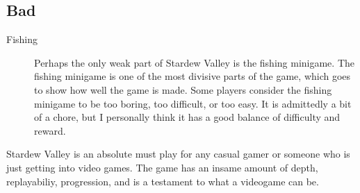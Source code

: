 \documentclass{article}
\begin{document}
\subsection{Bad}
\begin{description}
      \item[Fishing] Perhaps the only weak part of Stardew Valley is the fishing
            minigame. The fishing minigame is one of the most divisive parts of
            the game, which goes to show how well the game is made. Some players
            consider the fishing minigame to be too boring, too difficult, or
            too easy. It is admittedly a bit of a chore, but I personally think
            it has a good balance of difficulty and reward.
\end{description}

Stardew Valley is an absolute must play for any casual gamer or someone who is
just getting into video games. The game has an insame amount of depth,
replayabiliy, progression, and is a testament to what a videogame can be.
\end{document}
